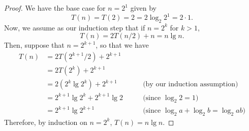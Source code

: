 
\begin{proof}
    We have the base case for $n = 2^1$ given by 
    \[
        T(n) = T(2) = 2 = 2\log_2{2^1} = 2 \cdot 1.
    \]
    Now, we assume as our induction step that if $n = 2^k$ for $k > 1$,
    \[
        T(n) = 2T(n/2) + n = n\lg{n}.
    \]
    Then, suppose that $n = 2^{k+1}$, so that we have
    \begin{align*}
T(n) &= 2T(2^{k+1}/2) + 2^{k+1} &\, \\
             &= 2T(2^k) + 2^{k+1} &\, \\
             &= 2(2^k\lg{2^k}) + 2^{k+1} \qquad 
                 &\text{(by our induction assumption)} \\
                 &= 2^{k+1}\lg{2^k} + 2^{k+1}\lg{2} \qquad 
                 &\text{(since $\log_2{2} = 1$)} \\
                 &= 2^{k+1}\lg{2^{k+1}} \qquad 
                 &\text{(since $\log_2{a} + \log_2{b} = \log_2{ab}$)} 
    \end{align*}
    Therefore, by induction on $n = 2^k$, $T(n) = n\lg{n}$.
\end{proof}
